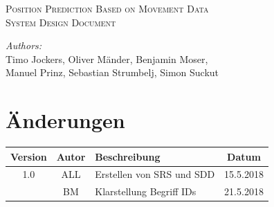 \documentclass[12pt]{article} %
\begin{document}


\begin{titlepage}

\newcommand{\HRule}{\rule{\linewidth}{0.5mm}} %

\center %

\textsc{\Large Position Prediction Based on Movement Data}\\[0.5cm] %
\textsc{\large System Design Document}\\[0.5cm] %

\vfill

\emph{Authors:}\\
Timo Jockers, Oliver Mänder, Benjamin Moser, \\
Manuel Prinz, Sebastian Strumbelj, Simon Suckut

\vfill %

\end{titlepage}


\tableofcontents %

\newpage %


\section{Änderungen}


\begin{tabular}{|c|c|p{10cm}|c|}
\hline
Version & Autor & Beschreibung & Datum \\ \hline\hline

1.0 & ALL & Erstellen von SRS und SDD & 15.5.2018 \\\hline
	& BM  &	Klarstellung Begriff IDs  &	21.5.2018 \\\hline

\end{tabular}
\end{document}
